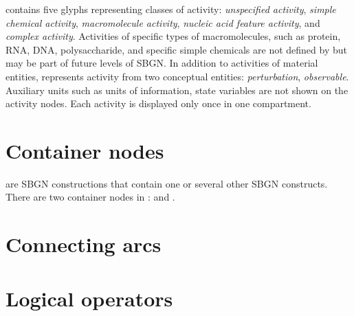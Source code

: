 \SBGNAFLone contains five glyphs representing classes of activity:
\emph{unspecified activity}, \emph{simple chemical activity}, \emph{macromolecule activity}, \emph{nucleic acid feature activity}, and \emph{complex activity}. Activities of specific types of macromolecules, such as protein, RNA, DNA, polysaccharide, and specific simple chemicals are not defined by \SBGNAFLone but may be part of future levels of SBGN. In addition to activities of material entities, \SBGNAFLone represents activity from two conceptual entities: \emph{perturbation}, \emph{observable}.  Auxiliary units such as units of information, state variables are not shown on the activity nodes.  Each activity is displayed only once in one compartment.











\section{Container nodes}
\label{sec:af:CNs}

 are SBGN constructions that contain one or several other SBGN constructs.  There are two container nodes in \SBGNAFLone:  and .





\section{Connecting arcs}\label{sec:af:arcs}







\section{Logical operators}\label{sec:af:logic}




